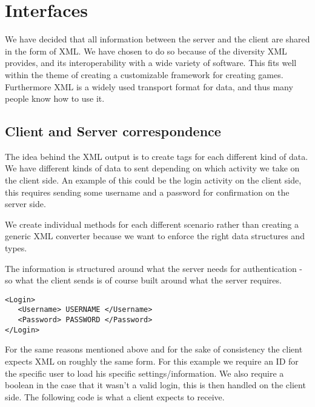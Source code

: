 \section{Interfaces}

We have decided that all information between the server and the client are shared in the form of XML. We have chosen to do so because of the diversity XML provides, and its interoperability with a wide variety of software. This fits well within the theme of creating a customizable framework for creating games. Furthermore XML is a widely used transport format for data, and thus many people know how to use it.%

\subsection{Client and Server correspondence}

The idea behind the XML output is to create tags for each different kind of data. We have different kinds of data to sent depending on which activity we take on the client side. An example of this could be the login activity on the client side, this requires sending some username and a password for confirmation on the server side.

We create individual methods for each different scenario rather than creating a generic XML converter because we want to enforce the right data structures and types. 

The information is structured around what the server needs for authentication - so what the client sends is of course built around what the server requires.

\begin{lstlisting}
<Login>
   <Username> USERNAME </Username>
   <Password> PASSWORD </Password>
</Login>
\end{lstlisting}

For the same reasons mentioned above and for the sake of consistency the client expects XML on roughly the same form. For this example we require an ID for the specific user to load his specific settings/information. We also require a boolean in the case that it wasn't a valid login, this is then handled on the client side. The following code is what a client expects to receive.

